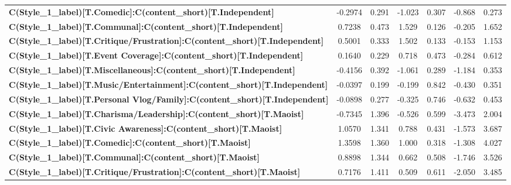 \begin{center}
\begin{tabular}{lcccccc}
\textbf{C(Style\_1\_label)[T.Comedic]:C(content\_short)[T.Independent]}              &      -0.2974  &        0.291     &    -1.023  &         0.307        &       -0.868    &        0.273     \\
\textbf{C(Style\_1\_label)[T.Communal]:C(content\_short)[T.Independent]}             &       0.7238  &        0.473     &     1.529  &         0.126        &       -0.205    &        1.652     \\
\textbf{C(Style\_1\_label)[T.Critique/Frustration]:C(content\_short)[T.Independent]} &       0.5001  &        0.333     &     1.502  &         0.133        &       -0.153    &        1.153     \\
\textbf{C(Style\_1\_label)[T.Event Coverage]:C(content\_short)[T.Independent]}       &       0.1640  &        0.229     &     0.718  &         0.473        &       -0.284    &        0.612     \\
\textbf{C(Style\_1\_label)[T.Miscellaneous]:C(content\_short)[T.Independent]}        &      -0.4156  &        0.392     &    -1.061  &         0.289        &       -1.184    &        0.353     \\
\textbf{C(Style\_1\_label)[T.Music/Entertainment]:C(content\_short)[T.Independent]}  &      -0.0397  &        0.199     &    -0.199  &         0.842        &       -0.430    &        0.351     \\
\textbf{C(Style\_1\_label)[T.Personal Vlog/Family]:C(content\_short)[T.Independent]} &      -0.0898  &        0.277     &    -0.325  &         0.746        &       -0.632    &        0.453     \\
\textbf{C(Style\_1\_label)[T.Charisma/Leadership]:C(content\_short)[T.Maoist]}       &      -0.7345  &        1.396     &    -0.526  &         0.599        &       -3.473    &        2.004     \\
\textbf{C(Style\_1\_label)[T.Civic Awareness]:C(content\_short)[T.Maoist]}           &       1.0570  &        1.341     &     0.788  &         0.431        &       -1.573    &        3.687     \\
\textbf{C(Style\_1\_label)[T.Comedic]:C(content\_short)[T.Maoist]}                   &       1.3598  &        1.360     &     1.000  &         0.318        &       -1.308    &        4.027     \\
\textbf{C(Style\_1\_label)[T.Communal]:C(content\_short)[T.Maoist]}                  &       0.8898  &        1.344     &     0.662  &         0.508        &       -1.746    &        3.526     \\
\textbf{C(Style\_1\_label)[T.Critique/Frustration]:C(content\_short)[T.Maoist]}      &       0.7176  &        1.411     &     0.509  &         0.611        &       -2.050    &        3.485     \\

\end{tabular}
\end{center}
